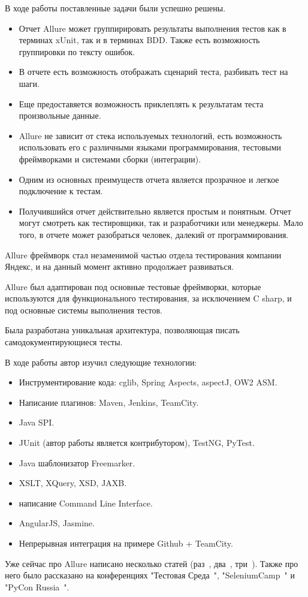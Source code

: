 \startconclusionpage

В ходе работы поставленные задачи были успешно решены.

\begin{itemize}
\item Отчет Allure может группирировать результаты выполнения тестов как в терминах xUnit, так и в терминах BDD. Также есть возможность группировки по тексту ошибок.
\item В отчете есть возможность отображать сценарий теста, разбивать тест на шаги.
\item Еще предоставяется возможность приклеплять к результатам теста произвольные данные.
\item Allure не зависит от стека используемых технологий, есть возможность использовать его с различными языками программирования, тестовыми фреймворками и системами сборки (интеграции). 
\item Одним из основных преимуществ отчета является прозрачное и легкое подключение к тестам.
\item Получившийся отчет действительно является простым и понятным. Отчет могут смотреть как тестировщики, так и разработчики или менеджеры. Мало того, в отчете может разобраться человек, далекий от программирования.
\end{itemize}

Allure фреймворк стал незаменимой частью отдела тестирования компании Яндекс, и на данный момент активно продолжает развиваться. 

Allure был адаптирован под основные тестовые фреймворки, которые используются для функционального тестирования, за исключением C sharp, и под основные системы выполнения тестов. 

Была разработана уникальная архитектура, позволяющая писать самодокументирующиеся тесты.

В ходе работы автор изучил следующие технологии:

\begin{itemize}
\item Инструментирование кода: cglib, Spring Aspects, aspectJ, OW2 ASM.
\item Написание плагинов: Maven, Jenkins, TeamCity.
\item Java SPI.
\item JUnit (автор работы является контрибутором), TestNG, PyTest.
\item Java шаблонизатор Freemarker.
\item XSLT, XQuery, XSD, JAXB.
\item написание Command Line Interface.
\item AngularJS, Jasmine.
\item Непрерывная интеграция на примере Github + TeamCity.
\end{itemize}

 
Уже сейчас про Allure написано несколько статей (раз~\cite{qa_bicycle}, два~\cite{hello_allure}, три~\cite{step_by_step}). Также про него было рассказано на конференциях "Тестовая Среда~\cite{testing_enviroment}", "SeleniumCamp~\cite{selconf}" и "PyCon Russia~\cite{pycon_russia}".

